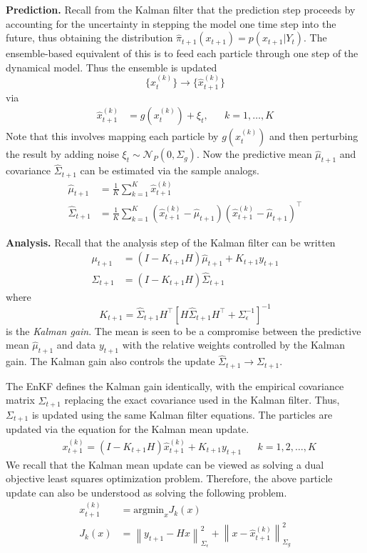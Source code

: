 \documentclass[12pt]{article}
\newcommand*{\norm}[1]{\left\lVert#1\right\rVert}
\begin{document}
\bigskip
\noindent
\textbf{Prediction.} Recall from the Kalman filter that the prediction step proceeds by accounting for the uncertainty in stepping the model one time step into 
the future, thus obtaining the distribution $\hat{\pi}_{t+1}(x_{t+1}) = p(x_{t+1}|Y_t)$. The ensemble-based equivalent of this is to feed each particle through one 
step of the dynamical model. Thus the ensemble is updated 
\[\{x_t^{(k)}\} \to \{\hat{x}_{t+1}^{(k)}\}\]
via 
\begin{align*}
\hat{x}_{t+1}^{(k)} &= g(x_t^{(k)}) + \xi_t,  &&k = 1, \dots, K
\end{align*}
Note that this involves mapping each particle by $g(x_t^{(k)})$ and then perturbing the result by adding noise $\xi_t \sim \mathcal{N}_P(0, \Sigma_g)$. Now 
the predictive mean $\hat{\mu}_{t+1}$ and covariance $\hat{\Sigma}_{t+1}$ can be estimated via the sample analogs. 
\begin{align*}
\hat{\mu}_{t+1} &= \frac{1}{K} \sum_{k = 1}^{K} \hat{x}_{t+1}^{(k)} \\
\hat{\Sigma}_{t+1} &= \frac{1}{K} \sum_{k = 1}^{K} \left(\hat{x}_{t+1}^{(k)} - \hat{\mu}_{t+1} \right) \left(\hat{x}_{t+1}^{(k)} - \hat{\mu}_{t+1} \right)^\top
\end{align*}

\bigskip
\noindent
\textbf{Analysis.} Recall that the analysis step of the Kalman filter can be written 
\begin{align*}
\mu_{t+1} &= (I - K_{t+1}H) \hat{\mu}_{t+1} + K_{t+1} y_{t+1} \\
\Sigma_{t+1} &= (I - K_{t+1}H) \hat{\Sigma}_{t+1}
\end{align*}
where 
\[K_{t+1} = \hat{\Sigma}_{t+1} H^\top \left[H \hat{\Sigma}_{t+1}H^\top + \Sigma_{\epsilon}^{-1}   \right]^{-1} \]
is the \textit{Kalman gain}. The mean is seen to be a compromise between the predictive mean $\hat{\mu}_{t+1}$ and data 
$y_{t+1}$ with the relative weights controlled by the Kalman gain. The Kalman gain also controls the update 
$\hat{\Sigma}_{t+1} \to \Sigma_{t+1}$.  

The EnKF defines the Kalman gain identically, with the empirical covariance matrix $\hat{\Sigma}_{t+1}$ replacing the exact covariance used in the Kalman 
filter. Thus, $\Sigma_{t+1}$ is updated using the same Kalman filter equations. The particles are updated via the equation for the Kalman mean update. 
\begin{align}
&x^{(k)}_{t+1} = (I - K_{t+1}H) \hat{x}^{(k)}_{t+1} + K_{t+1} y_{t+1} && k = 1, 2, \dots, K \label{EnKF_analysis_update}
\end{align}
We recall that the Kalman mean update can be viewed as solving a dual objective least squares optimization problem. Therefore, the above particle update 
can also be understood as solving the following problem. 
\begin{align*}
x^{(k)}_{t+1} &= \text{argmin}_{x} J_k(x) \\
J_k(x) &= \norm{y_{t+1} - H x}^2_{\Sigma_{\epsilon}} + \norm{x - \hat{x}^{(k)}_{t+1}}^2_{\Sigma_g}
\end{align*}
\end{document}

